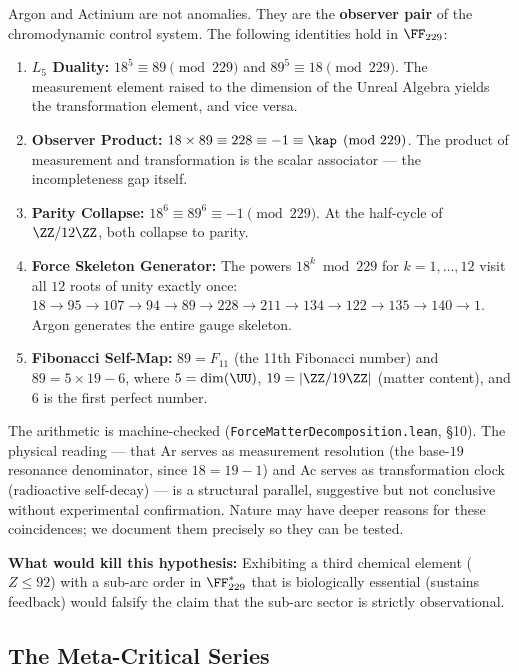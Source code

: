 \begin{hypothesis}\label{hyp:self-ref}
Argon and Actinium are not anomalies. They are the \textbf{observer pair} of the chromodynamic control system. The following identities hold in $\FF_{229}$:
\begin{enumerate}
\item \textbf{$L_5$ Duality:} $18^5 \equiv 89 \pmod{229}$ and $89^5 \equiv 18 \pmod{229}$. The measurement element raised to the dimension of the Unreal Algebra yields the transformation element, and vice versa.
\item \textbf{Observer Product:} $18 \times 89 \equiv 228 \equiv -1 \equiv \kap \pmod{229}$. The product of measurement and transformation is the scalar associator --- the incompleteness gap itself.
\item \textbf{Parity Collapse:} $18^6 \equiv 89^6 \equiv -1 \pmod{229}$. At the half-cycle of $\ZZ/12\ZZ$, both collapse to parity.
\item \textbf{Force Skeleton Generator:} The powers $18^k \bmod 229$ for $k = 1, \ldots, 12$ visit all $12$ roots of unity exactly once: $18 \to 95 \to 107 \to 94 \to 89 \to 228 \to 211 \to 134 \to 122 \to 135 \to 140 \to 1$. Argon generates the entire gauge skeleton.
\item \textbf{Fibonacci Self-Map:} $89 = F_{11}$ (the 11th Fibonacci number) and $89 = 5 \times 19 - 6$, where $5 = \dim(\UU)$, $19 = |\ZZ/19\ZZ|$ (matter content), and $6$ is the first perfect number.
\end{enumerate}
The arithmetic is machine-checked (\texttt{ForceMatterDecomposition.lean}, \S 10). The physical reading --- that Ar serves as measurement resolution (the base-$19$ resonance denominator, since $18 = 19 - 1$) and Ac serves as transformation clock (radioactive self-decay) --- is a structural parallel, suggestive but not conclusive without experimental confirmation. Nature may have deeper reasons for these coincidences; we document them precisely so they can be tested.
\end{hypothesis}

\noindent\textbf{What would kill this hypothesis:} Exhibiting a third chemical element ($Z \leq 92$) with a sub-arc order in $\FF_{229}^*$ that is biologically essential (sustains feedback) would falsify the claim that the sub-arc sector is strictly observational.


\subsection{The Meta-Critical Series}


